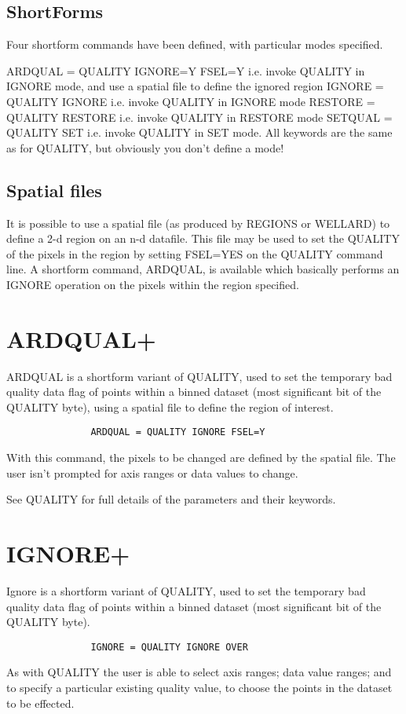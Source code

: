 \documentclass{book}
\renewcommand{\_}{{\tt\char'137}}     %
\begin{document}
\subsection{ShortForms}
Four shortform commands have been defined, with particular
modes specified.

ARDQUAL = QUALITY IGNORE=Y FSEL=Y
i.e. invoke QUALITY in IGNORE mode, and
use a spatial file to define the ignored region
IGNORE = QUALITY IGNORE
i.e. invoke QUALITY in IGNORE mode
RESTORE = QUALITY RESTORE
i.e. invoke QUALITY in RESTORE mode
SETQUAL = QUALITY SET
i.e. invoke QUALITY in SET mode.
All keywords are the same as for QUALITY, but obviously you don't
define a mode!

\subsection{Spatial files}
It is possible to use a spatial file (as produced by REGIONS or WELLARD)
to define a 2-d region on an n-d datafile. This file may be used to
set the QUALITY of the pixels in the region by setting FSEL=YES on
the QUALITY command line. A shortform command, ARDQUAL, is available
which basically performs an IGNORE operation on the pixels within
the region specified.

\section{ARDQUAL+}
ARDQUAL is a shortform variant of QUALITY, used to set the
temporary bad quality data flag of points within a binned
dataset (most significant bit of the QUALITY byte), using a
spatial file to define the region of interest.

\begin{verbatim}
               ARDQUAL = QUALITY IGNORE FSEL=Y
\end{verbatim}
With this command, the pixels to be changed are defined by the
spatial file. The user isn't prompted for axis ranges or data
values to change.

See QUALITY for full details of the parameters and their keywords.

\section{IGNORE+}
Ignore is a shortform variant of QUALITY, used to set the
temporary bad quality data flag of points within a binned
dataset (most significant bit of the QUALITY byte).
\begin{verbatim}
               IGNORE = QUALITY IGNORE OVER
\end{verbatim}
As with QUALITY the user is able to select axis ranges; data
value ranges; and to specify a particular existing quality value,
to choose the points in the dataset to be effected.
\end{document}
